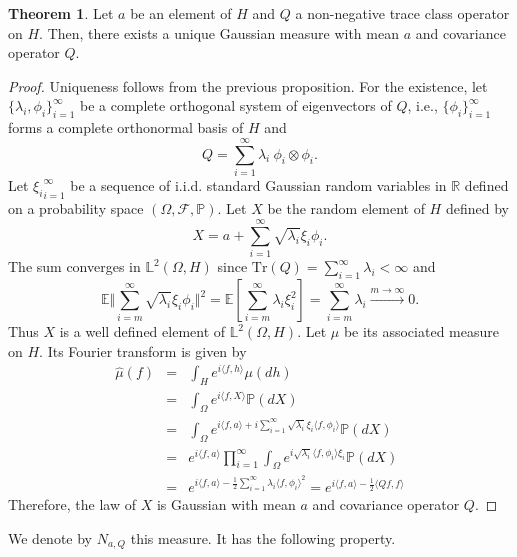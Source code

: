 \documentclass[10pt, a4paper]{report}
\newcommand{\E}[0]{\mathbb{E}}
\newcommand{\Ll}[0]{\mathbb{L}}
\newcommand{\R}[0]{\mathbb{R}}
\newcommand{\Pp}[0]{\mathbb{P}}
\theoremstyle{definition}
\newtheorem{theorem}{Theorem}
\theoremstyle{remark}
\begin{document}
\begin{theorem}\label{uniquegausshilb}
	Let $a$ be an element of $H$ and $Q$ a non-negative trace class operator on $H$. Then, there exists a unique Gaussian measure with mean $a$ and covariance operator $Q$.
	\begin{proof}
		Uniqueness follows from the previous proposition. For the existence, let $\{\lambda_i, \phi_i \}_{i=1}^\infty$ be a complete orthogonal system of eigenvectors of $Q$, i.e., $\{\phi_i\}_{i=1}^\infty$ forms a complete orthonormal basis of $H$ and 
		$$Q = \sum_{i=1}^{\infty} \lambda_i\ \phi_i \otimes \phi_i.$$
		Let ${\xi_i}_{i=1}^\infty$ be a sequence of i.i.d. standard Gaussian random variables in $\R$ defined on a probability space $(\Omega,\mathcal{F},\Pp)$. Let $X$ be the random element of $H$ defined by 
		$$X = a + \sum_{i=1}^{\infty} \sqrt{\lambda_i} \xi_i \phi_i.$$
		The sum converges in $\Ll^2(\Omega,H)$ since $\mathrm{Tr}(Q) = \sum_{i=1}^{\infty}\lambda_i<\infty$ and
		$$\E\Vert \sum_{i=m}^{\infty} \sqrt{\lambda_i} \xi_i \phi_i \Vert^2 = \E\left[\sum_{i=m}^{\infty} \lambda_i \xi_i^2 \right] = \sum_{i=m}^{\infty}\lambda_i \stackrel{m\to \infty}{\longrightarrow} 0.$$
		Thus $X$ is a well defined element of $\Ll^2(\Omega,H)$. Let $\mu$ be its associated measure on $H$. Its Fourier transform is given by 
		\begin{eqnarray}
			\widehat{\mu}(f) & = & \int_H e^{i \langle f,h\rangle} \mu(dh)\\
			& = & \int_{\Omega} e^{i \langle f,X\rangle} \Pp(dX)\\ 
			& = & \int_{\Omega} e^{i \langle f,a\rangle + i\sum_{i=1}^{\infty}\sqrt{\lambda_i}\xi_i\langle f,\phi_i\rangle} \Pp(dX)\\
			& = & e^{i\langle f,a \rangle}\prod_{i=1}^{\infty} \int_{\Omega} e^{i\sqrt{\lambda_i}\langle f,\phi_i\rangle\xi_i} \Pp(dX)\\
			& = & e^{i\langle f,a \rangle - \frac{1}{2} \sum_{i=1}^{\infty} \lambda_i \langle f,\phi_i\rangle^2} = e^{i\langle f,a \rangle - \frac{1}{2}\langle Qf,f\rangle}
		\end{eqnarray}
		Therefore, the law of $X$ is Gaussian with mean $a$ and covariance operator $Q$.
	\end{proof}
\end{theorem}
We denote by $N_{a,Q}$ this measure. It has the following property.
\end{document}
